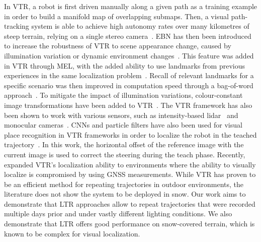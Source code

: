 In \ac{VTR}, a robot is first driven manually along a given path as a training example in order to build a manifold map of overlapping submaps. 
Then, a visual path-tracking system is able to achieve high autonomy rates over many kilometres of steep terrain, relying on a single stereo camera~\citep{Furgale2010}. 
\ac{EBN} has then been introduced to increase the robustness of \ac{VTR} to scene appearance change, caused by illumination variation or dynamic environment changes~\citep{Churchill2013}. 
This feature was added in \ac{VTR} through \ac{MEL}, with the added ability to use landmarks from previous experiences in the same localization problem~\citep{Paton2016}.
Recall of relevant landmarks for a specific scenario was then improved in computation speed through a bag-of-word approach~\citep{MacTavish2017}.
To mitigate the impact of illumination variations, colour-constant image transformations have been added to \ac{VTR}~\citep{Paton2015}. 
The \ac{VTR} framework has also been shown to work with various sensors, such as intensity-based lidar~\citep{McManus2013} and monocular cameras~\citep{Clement2017}.
\acp{CNN} and particle filters have also been used for visual place recognition in \ac{VTR} frameworks in order to localize the robot in the teached trajectory~\citep{Camara2020}.
In this work, the horizontal offset of the reference image with the current image is used to correct the steering during the teach phase.
Recently,~\citet{Congram2021} expanded \ac{VTR}'s localization ability to environments where the ability to visually localize is compromised by using \ac{GNSS} measurements.
While \ac{VTR} has proven to be an efficient method for repeating trajectories in outdoor environments, the literature does not show the system to be deployed in snow.
Our work aims to demonstrate that \ac{LTR} approaches allow to repeat trajectories that were recorded multiple days prior and under vastly different lighting conditions. 
We also demonstrate that \ac{LTR} offers good performance on snow-covered terrain, which is known to be complex for visual localization.


